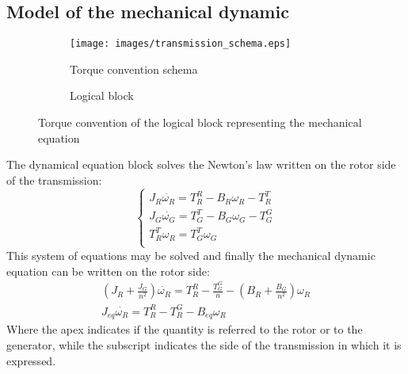 \subsection[Mechanical dynamic]{Model of the mechanical dynamic}
\begin{figure}
  \centering
  \begin{subfigure}{0.6\columnwidth}
    \centering
    \texttt{[image: images/transmission\_schema.eps]}
    \caption{Torque convention schema}
    \label{fig:transmission_convention}
  \end{subfigure}
  
  \begin{subfigure}{0.5\columnwidth}
    \centering
      
      \caption{Logical block}
    \label{fig:d_mech_equation_block}
  \end{subfigure}
  \caption{Torque convention of the logical block representing the mechanical equation}
\end{figure}
The dynamical equation block solves the Newton's law written on the rotor side of the transmission:
\begin{equation}
    \begin{cases}
      J_R \dot{\omega_R} = T_R^R - B_R\omega_R - T_R^T\\
      J_G \dot{\omega_G} = T_G^T - B_G\omega_G - T_G^G\\
      T_R^T\omega_R = T_G^T\omega_G\\
    \end{cases}
\end{equation}
This system of equations may be solved and finally the mechanical dynamic equation can be written on the rotor side:
\begin{gather}
    \left(J_R + \frac{J_G}{n^2}\right) \dot{\omega_R} = T_R^R - \frac{T_G^G}{n} - \left(B_R + \frac{B_G}{n^2}\right)\omega_R \\
    J_{eq} \dot{\omega_R} = T_R^R - T_R^G - B_{eq}\omega_R
    \label{eq:mech_eq}
\end{gather}
Where the apex indicates if the quantity is referred to the rotor or to the generator, while the subscript indicates the side of the transmission in which it is expressed.

